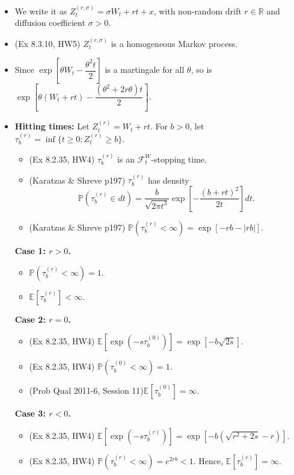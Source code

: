 \documentclass[twoside]{article}
\newcommand\bbE{\mathbb{E}}
\newcommand\bbP{\mathbb{P}}
\newcommand\bbR{\mathbb{R}}
\newcommand\calF{\mathcal{F}}
\newcommand\sg{\sigma}
\def\t{\theta}
\begin{document}
\begin{itemize}
\item We write it as $Z_t^{(r, \sg)} = \sg W_t + rt + x$, with non-random drift $r \in \bbR$ and diffusion coefficient $\sg > 0$.

\item (Ex 8.3.10, HW5) $Z_t^{(r, \sg)}$ is a homogeneous Markov process.

\item Since $\exp \left[ \t W_t - \dfrac{\t^2 t}{2} \right]$ is a martingale for all $\t$, so is $\exp \left[ \t (W_t + rt) - \dfrac{(\t^2 + 2r\t)t}{2} \right]$.

\item \textbf{Hitting times:} Let $Z_t^{(r)} = W_t + rt$. For $b > 0$, let $\tau_b^{(r)} = \inf \{ t \geq 0: Z_t^{(r)} \geq b\}$.
\begin{itemize}
\item (Ex 8.2.35, HW4) $\tau_b^{(r)}$ is an $\calF_t^W$-stopping time.
\item (Karatzas \& Shreve p197) $\tau_b^{(r)}$ has density
\[ \bbP \left(\tau_b^{(r)} \in dt \right) = \frac{b}{\sqrt{2\pi t^3}} \exp \left[ - \frac{(b+rt)^2}{2t} \right] dt. \]
\item (Karatzas \& Shreve p197) $\bbP \left( \tau_b^{(r)} < \infty \right) = \exp [-rb - |rb|]$.
\end{itemize}

\textbf{Case 1: $r > 0$.}
\begin{itemize}
\item $\bbP \left( \tau_b^{(r)} < \infty \right) = 1$.
\item $\bbE [\tau_b^{(r)}] < \infty$.
\end{itemize}

\textbf{Case 2: $r = 0$.}
\begin{itemize}
\item (Ex 8.2.35, HW4) $\bbE \left[\exp \left( -s\tau_b^{(0)} \right) \right] = \exp \left[-b\sqrt{2s} \right]$.
\item (Ex 8.2.35, HW4) $\bbP \left( \tau_b^{(0)} < \infty \right) = 1$.
\item (Prob Qual 2011-6, Session 11)$\bbE [\tau_b^{(0)}] = \infty$.
\end{itemize}

\textbf{Case 3: $r < 0$.}
\begin{itemize}
\item (Ex 8.2.35, HW4) $\bbE \left[\exp \left( -s\tau_b^{(r)} \right) \right] = \exp \left[-b(\sqrt{r^2 + 2s} -r) \right]$.
\item (Ex 8.2.35, HW4) $\bbP \left( \tau_b^{(r)} < \infty \right) = e^{2rb} < 1$. Hence, $\bbE [\tau_b^{(r)}] = \infty$.
\end{itemize}


\end{itemize}
\end{document}
